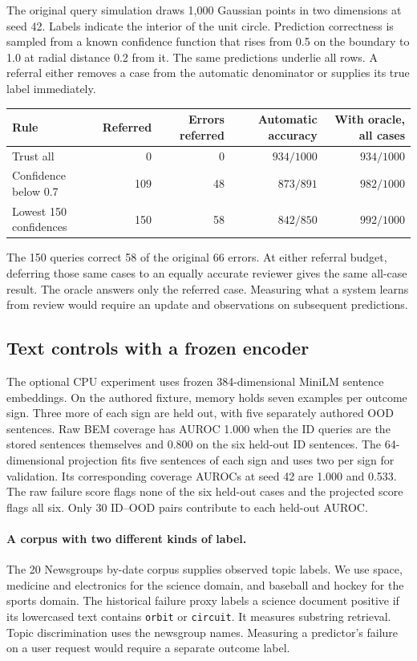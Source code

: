 The original query simulation draws 1,000 Gaussian points in two dimensions
at seed 42. Labels indicate the interior of the unit circle. Prediction
correctness is sampled from a known confidence function that rises from
0.5 on the boundary to 1.0 at radial distance 0.2 from it. The same predictions
underlie all rows. A referral either removes a case from the automatic
denominator or supplies its true label immediately.

\begin{center}
\small
\begin{tabular}{lrrrr}
\toprule
Rule & Referred & Errors referred & Automatic accuracy & With oracle, all cases \\
\midrule
Trust all & 0 & 0 & $934/1000$ & $934/1000$ \\
Confidence below 0.7 & 109 & 48 & $873/891$ & $982/1000$ \\
Lowest 150 confidences & 150 & 58 & $842/850$ & $992/1000$ \\
\bottomrule
\end{tabular}
\end{center}

The 150 queries correct 58 of the original 66 errors. At either referral
budget, deferring those same cases to an equally accurate reviewer gives
the same all-case result. The oracle answers only the referred case.
Measuring what a system learns from review would require an update and
observations on subsequent predictions.

\subsection{Text controls with a frozen encoder}

The optional CPU experiment uses frozen 384-dimensional MiniLM sentence
embeddings. On the authored fixture, memory holds seven examples per outcome
sign. Three more of each sign are held out, with five separately authored
OOD sentences. Raw BEM coverage has AUROC 1.000 when the ID queries are
the stored sentences themselves and 0.800 on the six held-out ID sentences.
The 64-dimensional projection fits five sentences of each sign and uses
two per sign for validation. Its corresponding coverage AUROCs at seed
42 are 1.000 and 0.533. The raw failure score flags none of the six held-out
cases and the projected score flags all six. Only 30 ID--OOD pairs contribute
to each held-out AUROC.

\paragraph{A corpus with two different kinds of label.}
The 20 Newsgroups by-date corpus supplies observed topic labels. We use
space, medicine and electronics for the science domain, and baseball and
hockey for the sports domain. The historical failure proxy labels a science
document positive if its lowercased text contains \texttt{orbit} or
\texttt{circuit}. It measures substring retrieval. Topic discrimination
uses the newsgroup names. Measuring a predictor's failure on a user request
would require a separate outcome label.

